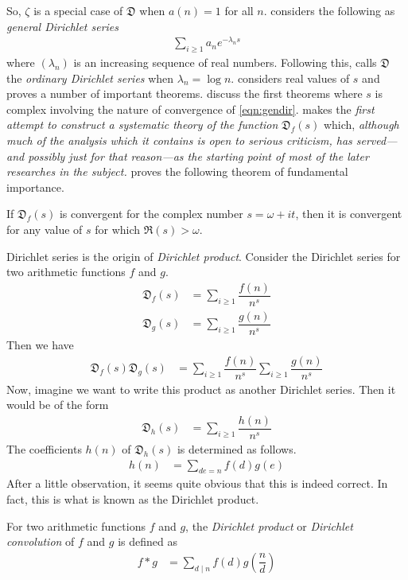 \documentclass[elemannt.tex]{subfile}
\begin{document}
	So, $\zeta$ is a special case of $\mathfrak{D}$ when $a(n)=1$ for all $n$. \textcite[$\S1$, Page $1$]{hardy_riesz_1915} considers the following as \textit{general Dirichlet series}
		\begin{align}
			\sum_{i\geq 1}a_{n}e^{-\lambda_{n}s}\label{eqn:gendir}
		\end{align}
	where $(\lambda_{n})$ is an increasing sequence of real numbers. Following this, \textcite{hardy_riesz_1915} calls $\mathfrak{D}$ the \textit{ordinary Dirichlet series} when $\lambda_{n}=\log{n}$. \textcite{lejeune_1879} considers real values of $s$ and proves a number of important theorems. \textcite{jensen_1884,jensen_1888} discuss the first theorems where $s$ is complex involving the nature of convergence of \ref{eqn:gendir}. \textcite{cahen_1894} makes the \textit{first attempt to construct a systematic theory of the function} $\mathfrak{D}_{f}(s)$ which, \textit{although much of the analysis which it contains is open to serious criticism, has served---and possibly just for that reason---as the starting point of most of the later researches in the subject.} \textcite{jensen_1884} proves the following theorem of fundamental importance.
		\begin{theorem}
			If $\mathfrak{D}_{f}(s)$ is convergent for the complex number $s=\omega+it$, then it is convergent for any value of $s$ for which $\Re(s)>\omega$.
		\end{theorem}
	Dirichlet series is the origin of \textit{Dirichlet product}. Consider the Dirichlet series for two arithmetic functions $f$ and $g$.
		\begin{align*}
			\mathfrak{D}_{f}(s)
				& = \sum_{i\geq 1}\dfrac{f(n)}{n^{s}}\\
			\mathfrak{D}_{g}(s)
				& = \sum_{i\geq 1}\dfrac{g(n)}{n^{s}}
		\end{align*}
	Then we have
		\begin{align*}
			\mathfrak{D}_{f}(s)\mathfrak{D}_{g}(s)
				& = \sum_{i\geq 1}\dfrac{f(n)}{n^{s}}\sum_{i\geq 1}\dfrac{g(n)}{n^{s}}
		\end{align*}
	Now, imagine we want to write this product as another Dirichlet series. Then it would be of the form
		\begin{align*}
			\mathfrak{D}_{h}(s)
				& = \sum_{i\geq 1}\dfrac{h(n)}{n^{s}}
		\end{align*}
	The coefficients $h(n)$ of $\mathfrak{D}_{h}(s)$ is determined as follows.
		\begin{align*}
			h(n)
				& = \sum_{de=n}f(d)g(e)
		\end{align*}
	After a little observation, it seems quite obvious that this is indeed correct. In fact, this is what is known as the Dirichlet product.
		\begin{definition}
			For two arithmetic functions $f$ and $g$, the \textit{Dirichlet product} or \textit{Dirichlet convolution} of $f$ and $g$ is defined as
				\begin{align*}
					f\ast g
						& = \sum_{d\mid n}f(d)g\left(\dfrac{n}{d}\right)
				\end{align*}
		\end{definition}
\end{document}
